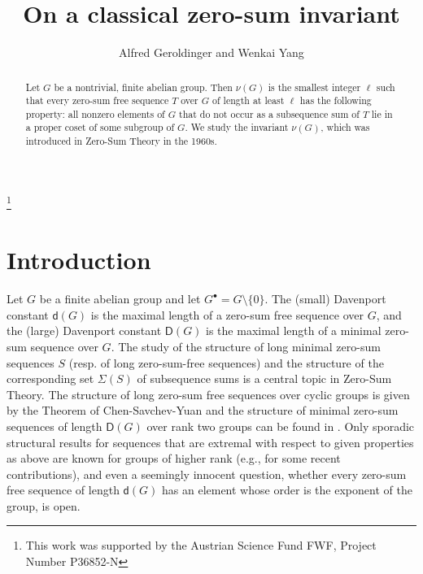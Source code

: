 \documentclass[a4paper, 10pt]{amsart}
\theoremstyle{plain}
\theoremstyle{definition}
\numberwithin{equation}{section}
\begin{document}
\title{On a classical zero-sum invariant}

\author{Alfred Geroldinger and Wenkai Yang}

\address{Department of Mathematics and Scientific Computing\\ University of Graz, NAWI Graz\\ Heinrichstra{\ss}e 36\\ 8010 Graz, Austria}

\address{Center for Combinatorics \\ Nankai University, Tianjin, P.R. China}




\thanks{This work was supported by the Austrian Science Fund FWF, Project Number P36852-N}


\maketitle



\begin{abstract}
Let $G$ be a nontrivial, finite abelian group. Then $\nu (G)$ is the smallest integer $\ell$ such that every zero-sum free sequence $T$ over $G$ of length at least $\ell$ has the following property: all nonzero elements of $G$ that do not occur as a subsequence sum of $T$ lie in a proper coset  of some subgroup of $G$. We study the  invariant $\nu (G)$, which was introduced in Zero-Sum Theory in the 1960s. 
\end{abstract}


\smallskip
\section{Introduction} \label{1}
\smallskip

Let $G$ be a finite abelian group and let $G^{\bullet} = G \setminus \{0\}$. The (small) Davenport constant $\mathsf d ( G)$ is the maximal length of a zero-sum free sequence over $G$, and the (large) Davenport constant $\mathsf D (G)$ is the maximal length of a minimal zero-sum sequence over $G$.  The study of the structure of long minimal zero-sum sequences $S$ (resp. of long zero-sum-free sequences) and the structure of the corresponding set $\Sigma (S)$ of subsequence sums is a central topic in Zero-Sum Theory. The structure of long zero-sum free sequences over cyclic groups is given by the Theorem of Chen-Savchev-Yuan and the structure of minimal zero-sum sequences of length $\mathsf D (G)$ over rank two groups can be found in \cite[Chapter 4]{Ge-Gr-Zh26a}. Only sporadic structural results for sequences that are extremal with respect to given properties as above are known for groups of higher rank (e.g., \cite{Gi08b,Sc12a, Gi-Sc20a,Zh21b,Fa-Hu-Zh24a,Hu-Hu-Li24,Zh26a} for some recent contributions), and even a seemingly innocent question, whether every zero-sum free sequence of length $\mathsf d (G)$ has an element whose order is the exponent of the group, is open. 
\end{document}
